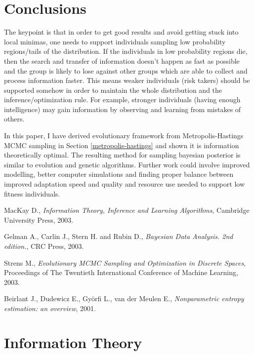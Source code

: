 \documentclass{article}
\begin{document}
\section{Conclusions} \label{conclusions}

The keypoint is that in order to get good results and avoid getting stuck into local minimas, one needs to support individuals sampling low probability regions/tails of the distribution. If the individuals in low probability regions die, then the search and transfer of information doesn't happen as fast as possible and the group is likely to lose against other groups which are able to collect and process information faster. This means weaker individuals (risk takers) should be supported somehow in order to maintain the whole distribution and the inference/optimization rule. For example, stronger individuals (having enough intelligence) may gain information by observing and learning from mistakes of others. 

In this paper, I have derived evolutionary framework from Metropolis-Hastings MCMC sampling in Section \ref{metropolis-hastings} and shown it is information theoretically optimal. The resulting method for sampling bayesian posterior is similar to evolution and genetic algorithms. Further work could involve improved modelling, better computer simulations and finding proper balance between improved adaptation speed and quality and resource use needed to support low fitness individuals.

\begin{thebibliography}{9}

  MacKay D.,
  \emph{Information Theory, Inference and Learning Algorithms},
  Cambridge University Press,
  2003.

  Gelman A., Carlin J., Stern H. and Rubin D.,
  \emph{Bayesian Data Analysis. 2nd edition.},
  CRC Press, 
  2003.

  Strens M.,
  \emph{Evolutionary MCMC Sampling and Optimization in Discrete Spaces},
  Proceedings of The Twentieth International Conference of Machine Learning,
  2003.

  Beirlant J., Dudewicz E., Györfi L., van der Meulen E.,
  \emph{Nonparametric entropy estimation: an overview},
  2001.

\end{thebibliography}


\appendix
\section{Information Theory} \label{information-theory}
\end{document}
